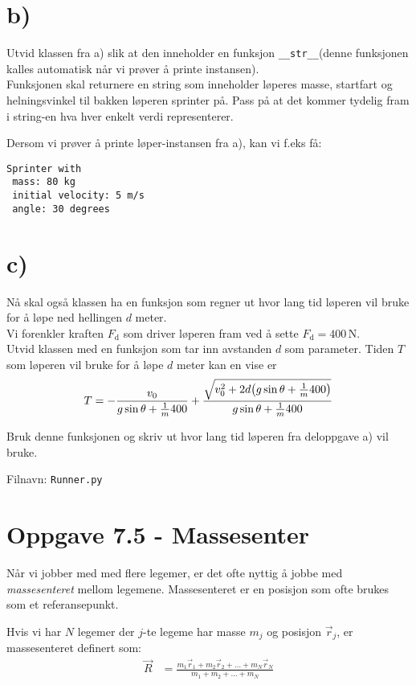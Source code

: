 \documentclass[10pt,a4paper]{article}
\begin{document}
\section*{b)}
Utvid klassen fra a) slik at den inneholder en funksjon \texttt{\_\_str\_\_}(denne funksjonen kalles automatisk når vi prøver å printe instansen). \\
Funksjonen skal returnere en string som inneholder løperes masse, startfart og helningsvinkel til bakken løperen sprinter på. Pass på at det kommer tydelig fram i string-en hva hver enkelt verdi representerer. 
 
Dersom vi prøver å printe løper-instansen fra a), kan vi f.eks få:
\begin{verbatim}
Sprinter with 
 mass: 80 kg 
 initial velocity: 5 m/s
 angle: 30 degrees
\end{verbatim} 
 
\section*{c)}
Nå skal også klassen ha en funksjon som regner ut hvor lang tid løperen vil bruke for å løpe ned hellingen $d$ meter. \\
Vi forenkler kraften $F_{\text{d}}$ som driver løperen fram ved å sette $F_{\text{d}} = 400\,\si{\newton}$. \\
 Utvid klassen med en funksjon som tar inn avstanden $d$ som parameter. Tiden $T$ som løperen vil bruke for å løpe $d$ meter kan en vise er
\[
T = -\frac{v_0}{g\sin\theta + \frac{1}{m}400} + \frac{\sqrt{v_0^2 + 2d\qty(g\sin\theta + \frac{1}{m}400) }}{g\sin\theta + \frac{1}{m}400}
\]
 
Bruk denne funksjonen og skriv ut hvor lang tid løperen fra deloppgave a) vil bruke. 
 
Filnavn: \texttt{Runner.py}
 
\section*{Oppgave 7.5 - Massesenter}
Når vi jobber med med flere legemer, er det ofte nyttig å jobbe med \textit{massesenteret} mellom legemene. Massesenteret er en posisjon som ofte brukes som et referansepunkt. 
 
Hvis vi har $N$ legemer der $j$-te legeme har masse $m_j$ og posisjon $\vec{r}_j$, er massesenteret definert som:
\begin{align*}
\vec{R} &= \frac{m_1\vec{r}_1 + m_2\vec{r}_2 + \dots + m_N\vec{r}_N }{m_1 + m_2 + \dots + m_N} 
\end{align*}
 
\end{document}

